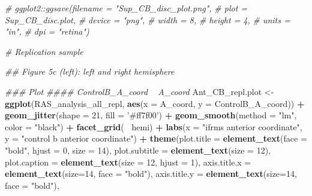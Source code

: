 \documentclass[
]{article}
\newenvironment{Shaded}{\begin{snugshade}}{\end{snugshade}}
\newcommand{\CommentTok}[1]{\textcolor[rgb]{0.56,0.35,0.01}{\textit{#1}}}
\newcommand{\DataTypeTok}[1]{\textcolor[rgb]{0.13,0.29,0.53}{#1}}
\newcommand{\DecValTok}[1]{\textcolor[rgb]{0.00,0.00,0.81}{#1}}
\newcommand{\KeywordTok}[1]{\textcolor[rgb]{0.13,0.29,0.53}{\textbf{#1}}}
\newcommand{\NormalTok}[1]{#1}
\newcommand{\OperatorTok}[1]{\textcolor[rgb]{0.81,0.36,0.00}{\textbf{#1}}}
\newcommand{\StringTok}[1]{\textcolor[rgb]{0.31,0.60,0.02}{#1}}
\begin{document}
\begin{Shaded}
\begin{Highlighting}[]
\CommentTok{# ggplot2::ggsave(filename = "Sup_CB_disc_plot.png",}
\CommentTok{#                 plot = Sup_CB_disc.plot,}
\CommentTok{#                 device = "png",}
\CommentTok{#                 width = 8,}
\CommentTok{#                 height = 4, }
\CommentTok{#                 units = "in",}
\CommentTok{#                 dpi = "retina")}


\CommentTok{# Replication sample}

\CommentTok{## Figure 5c (left): left and right hemisphere}

\CommentTok{### Plot }
\CommentTok{#### ControlB_A_coord ~ A_coord}
\NormalTok{Ant_CB_repl.plot <-}\StringTok{ }\KeywordTok{ggplot}\NormalTok{(RAS_analysis_all_repl,}
           \KeywordTok{aes}\NormalTok{(}\DataTypeTok{x =}\NormalTok{ A_coord, }\DataTypeTok{y =}\NormalTok{ ControlB_A_coord)) }\OperatorTok{+}\StringTok{ }
\StringTok{   }\KeywordTok{geom_jitter}\NormalTok{(}\DataTypeTok{shape =} \DecValTok{21}\NormalTok{, }\DataTypeTok{fill =} \StringTok{'#ff7f00'}\NormalTok{) }\OperatorTok{+}\StringTok{ }
\StringTok{   }\KeywordTok{geom_smooth}\NormalTok{(}\DataTypeTok{method =} \StringTok{"lm"}\NormalTok{, }\DataTypeTok{color =} \StringTok{"black"}\NormalTok{) }\OperatorTok{+}\StringTok{ }
\StringTok{   }\KeywordTok{facet_grid}\NormalTok{(}\OperatorTok{~}\StringTok{ }\NormalTok{hemi) }\OperatorTok{+}
\StringTok{   }\KeywordTok{labs}\NormalTok{(}\DataTypeTok{x =} \StringTok{"ifrms anterior coordinate"}\NormalTok{,}
        \DataTypeTok{y =} \StringTok{"control b anterior coordinate"}\NormalTok{) }\OperatorTok{+}\StringTok{ }
\StringTok{   }\KeywordTok{theme}\NormalTok{(}\DataTypeTok{plot.title =} \KeywordTok{element_text}\NormalTok{(}\DataTypeTok{face =} \StringTok{"bold"}\NormalTok{, }\DataTypeTok{hjust =} \DecValTok{0}\NormalTok{, }\DataTypeTok{size =} \DecValTok{14}\NormalTok{), }
         \DataTypeTok{plot.subtitle =} \KeywordTok{element_text}\NormalTok{(}\DataTypeTok{size =} \DecValTok{12}\NormalTok{),}
         \DataTypeTok{plot.caption =} \KeywordTok{element_text}\NormalTok{(}\DataTypeTok{size =} \DecValTok{12}\NormalTok{, }\DataTypeTok{hjust =} \DecValTok{1}\NormalTok{),}
         \DataTypeTok{axis.title.x =} \KeywordTok{element_text}\NormalTok{(}\DataTypeTok{size=}\DecValTok{14}\NormalTok{, }\DataTypeTok{face =} \StringTok{"bold"}\NormalTok{),}
         \DataTypeTok{axis.title.y =} \KeywordTok{element_text}\NormalTok{(}\DataTypeTok{size=}\DecValTok{14}\NormalTok{, }\DataTypeTok{face =} \StringTok{"bold"}\NormalTok{),}

\end{Highlighting}
\end{Shaded}
\end{document}
